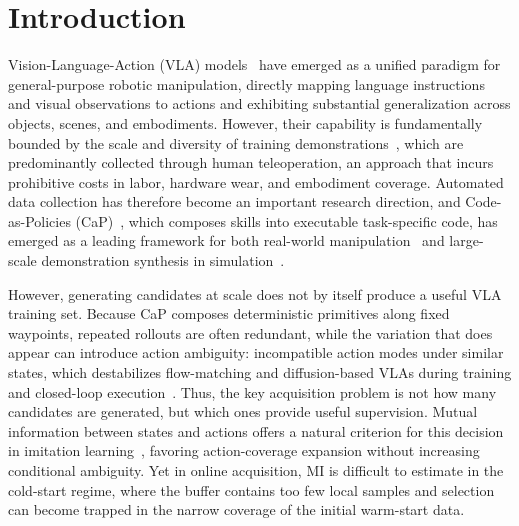 \documentclass{article}
\begin{document}
\section{Introduction}
    Vision-Language-Action (VLA) models~\citep{kim2024openvla, black2024pi_0, intelligence2025pi_, zitkovich2023rt, bjorck2025gr00t, team2024octo} have emerged as a unified paradigm for general-purpose robotic manipulation, directly mapping language instructions and visual observations to actions and exhibiting substantial generalization across objects, scenes, and embodiments. However, their capability is fundamentally bounded by the scale and diversity of training demonstrations~\citep{o2024open, khazatsky2024droid, walke2023bridgedata, wu2024robomind}, which are predominantly collected through human teleoperation, an approach that incurs prohibitive costs in labor, hardware wear, and embodiment coverage. Automated data collection has therefore become an important research direction, and Code-as-Policies (CaP)~\citep{liang2023code}, which composes skills into executable task-specific code, has emerged as a leading framework for both real-world manipulation~\citep{singh2023progprompt, huang2022inner, duan2024manipulate} and large-scale demonstration synthesis in simulation~\citep{wang2023robogen, mu2024robotwin}.

    However, generating candidates at scale does not by itself produce a useful VLA training set. 
    Because CaP composes deterministic primitives along fixed waypoints, repeated rollouts are often redundant, while the variation that does appear can introduce action ambiguity: incompatible action modes under similar states, which destabilizes flow-matching and diffusion-based VLAs during training and closed-loop execution~\citep{black2024pi_0, bjorck2025gr00t}. 
    Thus, the key acquisition problem is not how many candidates are generated, but which ones provide useful supervision. 
    Mutual information between states and actions offers a natural criterion for this decision in imitation learning~\citep{hejna2025robot}, favoring action-coverage expansion without increasing conditional ambiguity. 
    Yet in online acquisition, MI is difficult to estimate in the cold-start regime, where the buffer contains too few local samples and selection can become trapped in the narrow coverage of the initial warm-start data.
\end{document}
